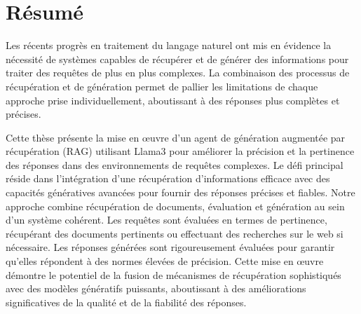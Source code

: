 \clearpage

\chapter*{Résumé}

Les récents progrès en traitement du langage naturel ont mis en évidence la nécessité de systèmes capables de récupérer et de générer des informations pour traiter des requêtes de plus en plus complexes. La combinaison des processus de récupération et de génération permet de pallier les limitations de chaque approche prise individuellement, aboutissant à des réponses plus complètes et précises.

\hfill

Cette thèse présente la mise en œuvre d'un agent de génération augmentée par récupération (RAG) utilisant Llama3 pour améliorer la précision et la pertinence des réponses dans des environnements de requêtes complexes. Le défi principal réside dans l'intégration d'une récupération d'informations efficace avec des capacités génératives avancées pour fournir des réponses précises et fiables. Notre approche combine récupération de documents, évaluation et génération au sein d'un système cohérent. Les requêtes sont évaluées en termes de pertinence, récupérant des documents pertinents ou effectuant des recherches sur le web si nécessaire. Les réponses générées sont rigoureusement évaluées pour garantir qu'elles répondent à des normes élevées de précision. Cette mise en œuvre démontre le potentiel de la fusion de mécanismes de récupération sophistiqués avec des modèles génératifs puissants, aboutissant à des améliorations significatives de la qualité et de la fiabilité des réponses.